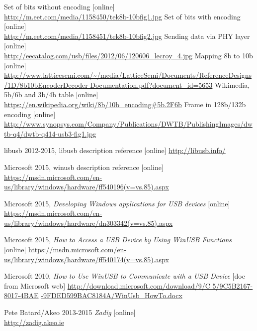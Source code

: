 \documentclass{BscUS}
\begin{document}
\begin{thebibliography}{1}
 Set of bits without encoding [online] \\
\url{http://m.eet.com/media/1158450/tek8b-10bfig1.jpg}
 Set of bits with encoding [online] \\
\url{http://m.eet.com/media/1158451/tek8b-10bfig2.jpg}
 Sending data via PHY layer [online] \\
\url{http://eecatalog.com/usb/files/2012/06/120606_lecroy_4.jpg}
 Mapping 8b to 10b [online] \\
\url{http://www.latticesemi.com/~/media/LatticeSemi/Documents/ReferenceDesigns/1D/8b10bEncoderDecoder-Documentation.pdf?document_id=5653}
 Wikimedia, 5b/6b and 3b/4b table [online] \\
\url{https://en.wikipedia.org/wiki/8b/10b_encoding#5b.2F6b}
 Frame in 128b/132b encoding [online] \\
\url{http://www.synopsys.com/Company/Publications/DWTB/PublishingImages/dwtb-q4/dwtb-q414-usb3-fig1.jpg}

 libusb 2012-2015, libusb description reference [online]
\newline 
\url{http://libusb.info/}

 Microsoft 2015, winusb description reference [online]
\newline 
\url{https://msdn.microsoft.com/en-us/library/windows/hardware/ff540196(v=vs.85).aspx}


 Microsoft 2015, {\em Developing Windows applications for USB devices} [online]
\newline 
\url{https://msdn.microsoft.com/en-us/library/windows/hardware/dn303342(v=vs.85).aspx}

 Microsoft 2015, {\em How to Access a USB Device by Using WinUSB Functions} [online]
\newline 
\url{https://msdn.microsoft.com/en-us/library/windows/hardware/ff540174(v=vs.85).aspx}

 Microsoft 2010, {\em How to Use WinUSB to Communicate with a USB Device} [doc from Microsoft web]
\newline 
\url{http://download.microsoft.com/download/9/C 5/9C5B2167-8017-4BAE} 
\newline 
\url{-9FDED599BAC8184A/WinUsb_HowTo.docx}

 Pete Batard/Akeo 2013-2015 {\em Zadig} [online] \\
\url{http://zadig.akeo.ie}


\end{thebibliography}
\end{document}
